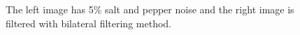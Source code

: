 \documentclass[a4paper, english]{article}
\begin{document}
\begin{figure}[H]
\centering
    \caption{The left image has 5\% salt and pepper noise and the right image is filtered with bilateral filtering method.}
\end{figure}
\end{document}
